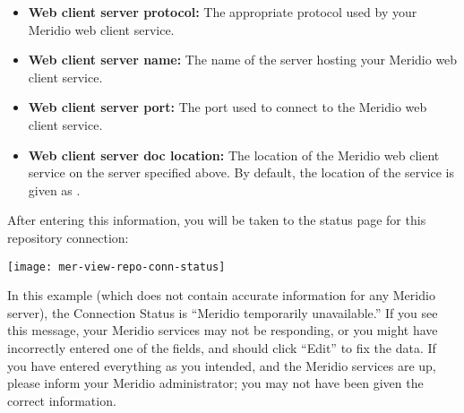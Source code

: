 \begin{itemize}

\item \textbf{Web client server protocol:}  The appropriate protocol used by your Meridio web client service.

\item \textbf{Web client server name:}  The name of the server hosting your Meridio web client service.

\item \textbf{Web client server port:}  The port used to connect to the Meridio web client service.

\item \textbf{Web client server doc location:}  The location of the Meridio web client service on the server specified above. By default, the location of the service is given as .

\end{itemize}

After entering this information, you will be taken to the status page
for this repository connection:

\texttt{[image: mer-view-repo-conn-status]}

In this example (which does not contain accurate information for
any Meridio server), the Connection Status is ``Meridio temporarily
unavailable.''  If you see this message, your Meridio services may not be
responding, or you might have incorrectly entered one of the fields, and
should click ``Edit'' to fix the data. If you have entered everything as
you intended,  and the Meridio services are up, please inform your Meridio
administrator; you may not have been given the correct information.


